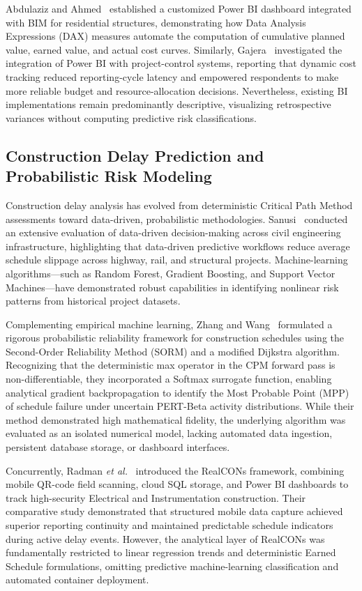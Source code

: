 \documentclass[conference]{IEEEtran}
\begin{document}
Abdulaziz and Ahmed~\cite{abdulaziz2026customized} established a customized Power BI dashboard integrated with BIM for residential structures, demonstrating how Data Analysis Expressions (DAX) measures automate the computation of cumulative planned value, earned value, and actual cost curves. Similarly, Gajera~\cite{gajera2023integrating} investigated the integration of Power BI with project-control systems, reporting that dynamic cost tracking reduced reporting-cycle latency and empowered respondents to make more reliable budget and resource-allocation decisions. Nevertheless, existing BI implementations remain predominantly descriptive, visualizing retrospective variances without computing predictive risk classifications.

\subsection{Construction Delay Prediction and Probabilistic Risk Modeling}

Construction delay analysis has evolved from deterministic Critical Path Method assessments toward data-driven, probabilistic methodologies. Sanusi~\cite{sanusi2024role} conducted an extensive evaluation of data-driven decision-making across civil engineering infrastructure, highlighting that data-driven predictive workflows reduce average schedule slippage across highway, rail, and structural projects. Machine-learning algorithms---such as Random Forest, Gradient Boosting, and Support Vector Machines---have demonstrated robust capabilities in identifying nonlinear risk patterns from historical project datasets.

Complementing empirical machine learning, Zhang and Wang~\cite{zhang2023quantifying} formulated a rigorous probabilistic reliability framework for construction schedules using the Second-Order Reliability Method (SORM) and a modified Dijkstra algorithm. Recognizing that the deterministic max operator in the CPM forward pass is non-differentiable, they incorporated a Softmax surrogate function, enabling analytical gradient backpropagation to identify the Most Probable Point (MPP) of schedule failure under uncertain PERT-Beta activity distributions. While their method demonstrated high mathematical fidelity, the underlying algorithm was evaluated as an isolated numerical model, lacking automated data ingestion, persistent database storage, or dashboard interfaces.

Concurrently, Radman \emph{et al.}~\cite{radman2026realcons} introduced the RealCONs framework, combining mobile QR-code field scanning, cloud SQL storage, and Power BI dashboards to track high-security Electrical and Instrumentation construction. Their comparative study demonstrated that structured mobile data capture achieved superior reporting continuity and maintained predictable schedule indicators during active delay events. However, the analytical layer of RealCONs was fundamentally restricted to linear regression trends and deterministic Earned Schedule formulations, omitting predictive machine-learning classification and automated container deployment.
\end{document}
